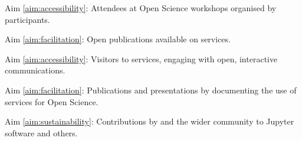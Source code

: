 \begin{compactenum}
  \item \label{kpi:workshop-attendees}
    Aim \ref{aim:accessibility}:
    Attendees at Open Science workshops organised by \TheProject participants.
  \item \label{kpi:binder-publications}
    Aim \ref{aim:facilitation}:
    Open publications available on \TheProject services.
  \item \label{kpi:binder-visits}
    Aim \ref{aim:accessibility}:
    Visitors to \TheProject services, engaging with open, interactive communications.
  \item \label{kpi:dissemination}
    Aim \ref{aim:facilitation}:
    Publications and presentations by \TheProject documenting the use of \TheProject services for Open Science.
  \item \label{kpi:contributions}
    Aim \ref{aim:sustainability}:
    Contributions by \TheProject and the wider community to Jupyter software and others.
\end{compactenum}


